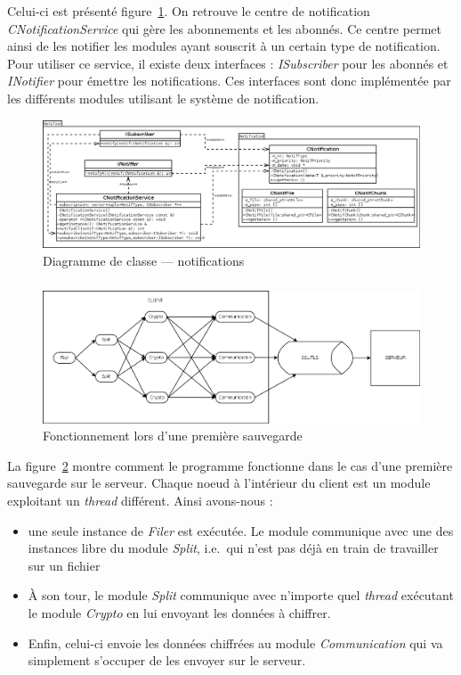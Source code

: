 \documentclass[a4paper,10pt, twoside]{report}
\begin{document}
\begin{spacing}{1.2}
Celui-ci est présenté figure~\ref{classDiagramNotif}. On retrouve le
centre de notification \textit{CNotificationService} qui gère les
abonnements et les abonnés. Ce centre permet ainsi de les notifier les modules
ayant souscrit à un certain type de notification. Pour utiliser ce service,
il existe deux interfaces : \textit{ISubscriber} pour les abonnés et
\textit{INotifier} pour émettre les notifications. Ces interfaces sont donc
implémentée par les différents modules utilisant le système de
notification.

\begin{figure}[h!]
  \hspace{-4.5em}
  \includegraphics[width=19cm]{softwareDesign/classDiagramNotif.png}
  \caption{\label{classDiagramNotif} Diagramme de classe --- notifications}
\end{figure}

\subparagraph{}
\begin{figure}[h!]
  \hspace{-1.5em}
  \includegraphics[width=17cm]{softwareDesign/moduleInteraction.png}
  \caption{\label{interactModule} Fonctionnement lors d'une première
  sauvegarde}
\end{figure}

La figure~\ref{interactModule} montre comment le programme fonctionne dans le
cas d'une première sauvegarde sur le serveur. Chaque noeud à l'intérieur
du client est un module exploitant un \textit{thread} différent. Ainsi
avons-nous :
\begin{itemize}
 \item une seule instance de \textit{Filer} est exécutée. Le module
 communique avec une des instances libre du module \textit{Split}, i.e.~qui
 n'est pas déjà en train de travailler sur un fichier
 \item À son tour, le module \textit{Split} communique avec n'importe quel
 \textit{thread} exécutant le module \textit{Crypto} en lui envoyant les
 données à chiffrer.
 \item Enfin, celui-ci envoie les données chiffrées au module
 \textit{Communication} qui va simplement s'occuper de les envoyer sur le
 serveur.
\end{itemize}


\end{spacing}
\end{document}
